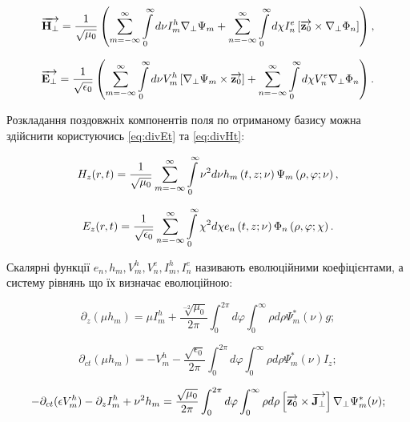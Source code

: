 \begin{equation}
\overrightarrow{\mathbf H_\perp} = \frac{1}{\sqrt{\mu_0}} \left( 
\sum \limits_{m=-\infty}^{\infty} \int \limits_{0}^{\infty} d \nu
I_m^h \nabla_\perp \Psi_m + \sum \limits_{n=-\infty}^{\infty}
\int \limits_{0}^{\infty} d \chi I_n^e 
\left[ \overrightarrow{\mathbf z_0} \times \nabla_\perp \Phi_n \right] \right),
\end{equation}

\begin{equation} 
\overrightarrow{\mathbf E_\perp} = \frac{1}{\sqrt{\epsilon_0}} \left( 
\sum \limits_{m=-\infty}^{\infty} \int \limits_{0}^{\infty} 
d \nu V_m^h \left[  \nabla_\perp \Psi_m  \times  \overrightarrow{\mathbf z_0}  \right] +
\sum \limits_{n=-\infty}^{\infty} \int \limits_{0}^{\infty}
d \chi V_n^e \nabla_\perp \Phi_n \right).
\end{equation}

Розкладання поздовжніх компонентів поля по отриманому базису можна здійснити
користуючись \eqref{eq:divEt} та \eqref{eq:divHt}:

\begin{equation} 
H_z (r,t) = \frac{1}{\sqrt{\mu_0}} \sum \limits_{m=-\infty}^\infty
\int \limits_0^\infty \nu^2 d \nu 
h_m \left( t, z; \nu \right) \Psi_m \left( \rho, \varphi; \nu \right),
\end{equation}

\begin{equation} 
E_z (r,t) = \frac{1}{\sqrt{\epsilon_0}} \sum \limits_{n=-\infty}^\infty
\int \limits_0^\infty \chi^2 d \chi 
e_n \left( t, z; \nu \right)  \Phi_n \left( \rho, \varphi; \chi \right).
\end{equation}

Скалярні функції $ e_n, h_m, V_m^h, V_n^e, I_m^h, I_n^e  $ називають 
еволюційними коефіцієнтами, а систему рівнянь що їх визначає еволюційною:

\begin{equation} \label{eq:evo1}
\partial_z (\mu h_m) = \mu I_m^h + \frac{\sqrt[-2]{\mu_0}}{2 \pi}
\int_0^{2\pi} d \varphi \int_0^{\infty} \rho d \rho
\Psi_m^* (\nu) g;
\end{equation}

\begin{equation} \label{eq:evo2}
\partial_{ct} (\mu h_m) = - V_m^h - \frac{\sqrt{\epsilon_0}}{2 \pi}
\int_0^{2\pi} d \varphi \int_0^{\infty} \rho d \rho
\Psi_m^* (\nu) I_z;
\end{equation}

\begin{equation} \label{eq:evo3}
- \partial_{ct} (\epsilon V_m^h) - \partial_z I_m^h + \nu^2 h_m = 
\frac{\sqrt{\mu_0}}{2 \pi} \int_0^{2\pi} d \varphi 
\int_0^{\infty} \rho d \rho \left[ \overrightarrow{\mathbf z_0} \times \overrightarrow{\mathbf J_\perp} \right]
\nabla_\perp \Psi_m^* (\nu);
\end{equation}

